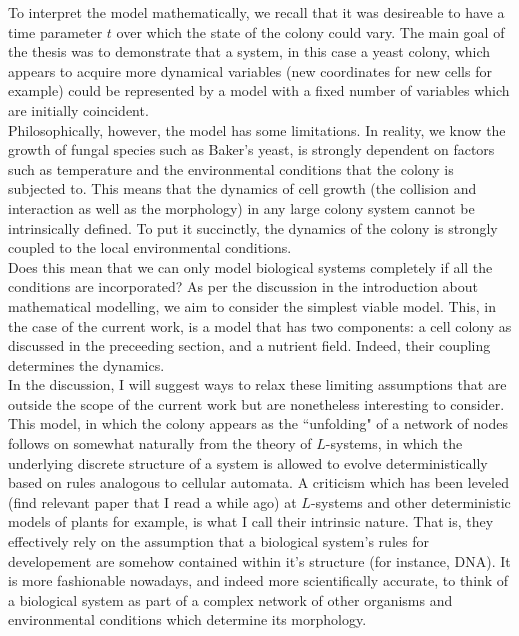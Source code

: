 To interpret the model mathematically, we recall that it was desireable to have
a time parameter $t$ over which the state of the colony could vary. The main 
goal of the thesis was to demonstrate that a system, in this case a yeast colony,
which appears to acquire more dynamical variables (new coordinates for new cells for example)
could be represented by a model with a fixed number of variables which are
initially coincident.
\\

Philosophically, however, the model has some limitations. In reality, we know the growth
of fungal species such as Baker's yeast, is strongly dependent on factors such as temperature
and the environmental conditions that the colony is subjected to. This means 
that the dynamics of cell growth (the collision and interaction as well as the morphology) in 
any large colony system cannot be intrinsically defined. To put it succinctly, the dynamics of 
the colony is strongly coupled to the local environmental conditions.
\\

Does this mean that we can only model biological systems completely if all the conditions 
are incorporated? As per the discussion in the introduction about mathematical modelling,
we aim to consider the simplest viable model. This, in the case of the current work, 
is a model that has two components: a cell colony as discussed in the preceeding section, and 
a nutrient field. Indeed, their coupling determines the dynamics. 
\\

In the discussion, I will suggest ways to relax these limiting assumptions that
are outside the scope of the current work but are nonetheless interesting to consider.
\\

This model, in which the colony appears as the ``unfolding" of a network of nodes
follows on somewhat naturally from the theory of $L$-systems, in which the underlying 
discrete structure of a system is allowed to evolve deterministically based on rules
analogous to cellular automata. A criticism which has been leveled 
(find relevant paper that I read a while ago) at $L$-systems and other deterministic models
of plants for example, is what I call their intrinsic nature. That is, they effectively
rely on the assumption that a biological system's rules for developement are somehow contained
within it's structure (for instance, DNA). It is more fashionable nowadays, and indeed more 
scientifically accurate, to think of a biological system as part of a complex network 
of other organisms and environmental conditions which determine its morphology.
\\

